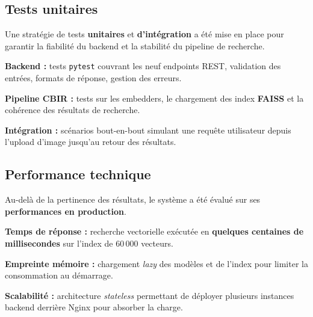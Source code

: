 \documentclass[12pt,a4paper]{article}
\begin{document}
\vspace{0.7cm}

\subsection{Tests unitaires}

\vspace{0.2cm}
Une stratégie de tests \textbf{unitaires} et \textbf{d'intégration} a été mise en place
pour garantir la fiabilité du backend et la stabilité du pipeline de recherche.

\vspace{0.2cm}
\begin{sq}
  \item \textbf{Backend :} tests \texttt{pytest} couvrant les neuf endpoints REST,
        validation des entrées, formats de réponse, gestion des erreurs.
  \item \textbf{Pipeline CBIR :} tests sur les embedders, le chargement des index
        \textbf{FAISS} et la cohérence des résultats de recherche.
  \item \textbf{Intégration :} scénarios bout-en-bout simulant une requête utilisateur
        depuis l'upload d'image jusqu'au retour des résultats.
\end{sq}

\vspace{0.7cm}

\subsection{Performance technique}

\vspace{0.2cm}
Au-delà de la pertinence des résultats, le système a été évalué sur ses
\textbf{performances en production}.

\vspace{0.2cm}
\begin{sq}
  \item \textbf{Temps de réponse :} recherche vectorielle exécutée en
        \textbf{quelques centaines de millisecondes} sur l'index de 60\,000 vecteurs.
  \item \textbf{Empreinte mémoire :} chargement \textit{lazy} des modèles et de l'index
        pour limiter la consommation au démarrage.
  \item \textbf{Scalabilité :} architecture \textit{stateless} permettant de déployer
        plusieurs instances backend derrière Nginx pour absorber la charge.
\end{sq}
\end{document}
